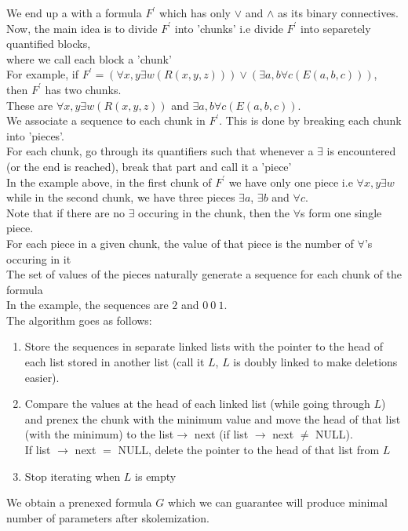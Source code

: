 \documentclass{article}
\begin{document}
\begin{flushleft}
We end up a with a formula $F^{'}$ which has only $\vee$ and $\wedge$ as its binary connectives.\\
Now, the main idea is to divide $F^{'}$ into 'chunks' i.e divide $F^{'}$ into separetely quantified blocks,\\
where we call each block a 'chunk'\\
For example, if $F^{'}= (\forall x,y\exists w(R(x,y,z)))\vee (\exists a,b\forall c(E(a,b,c)))$, then $F^{'}$ has two chunks.\\
These are $\forall x,y\exists w(R(x,y,z))$ and $\exists a,b\forall c(E(a,b,c))$.\\
We associate a sequence to each chunk in $F^{'}$. This is done by breaking each chunk into 'pieces'.\\
For each chunk, go through its quantifiers such that whenever a $\exists$ is encountered (or the end is reached), break that part and call it a 'piece'\\
In the example above, in the first chunk of $F^{'}$ we have only one piece i.e $\forall x,y\exists w$\\
while in the second chunk, we have three pieces $\exists a$, $\exists b$ and $\forall c$.\\
Note that if there are no $\exists$ occuring in the chunk, then the $\forall$s form one single piece.\\
For each piece in a given chunk, the value of that piece is the number of $\forall$'s occuring in it\\
The set of values of the pieces naturally generate a sequence for each chunk of the formula\\
In the example, the sequences are $2$ and $0 \:0\:1$.\\
The algorithm goes as follows: \\
\begin{enumerate}
\item Store the sequences in separate linked lists with the pointer to the head of each list stored in another list (call it $L$, $L$ is doubly linked to make deletions easier).\\
\item Compare the values at the head of each linked list (while going through $L$) and prenex the chunk with the minimum value and move the head of that list (with the minimum) to the list$\rightarrow$ next (if list $\rightarrow$ next $\neq$ NULL).\\
      If list $\rightarrow$ next $=$ NULL, delete the pointer to the head of that list from $L$
\item Stop iterating when $L$ is empty
\end{enumerate}
We obtain a prenexed formula $G$ which we can guarantee will produce minimal number of parameters after skolemization.
\end{flushleft}
\end{document}
